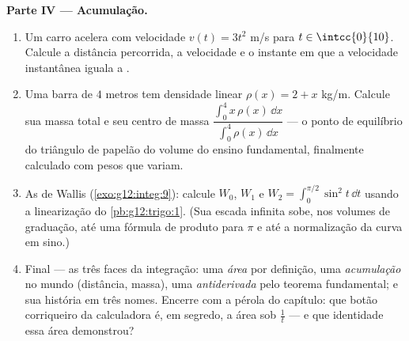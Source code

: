 \begin{problem}
\medskip
\noindent\textbf{Parte IV --- Acumulação.}
\begin{enumerate}[resume]
  \item Um carro acelera com velocidade $v(t) = 3t^2$ m/s para
        $t \in \intcc{0}{10}$. Calcule a distância percorrida, a
        velocidade  e o instante em que a velocidade
        instantânea iguala a .
  \item Uma barra de $4$ metros tem densidade linear
        $\rho(x) = 2 + x$ kg/m. Calcule sua massa total e seu
        centro de massa
        $\dfrac{\int_0^4 x\,\rho(x)\,\dd x}{\int_0^4
        \rho(x)\,\dd x}$ --- o ponto de equilíbrio do triângulo
        de papelão do volume do ensino fundamental, finalmente
        calculado com pesos que variam.
  \item As  de Wallis (\cref{exo:g12:integ:9}): calcule
        $W_0$, $W_1$ e $W_2 = \int_0^{\pi/2} \sin^2 t\,\dd t$
        usando a linearização do \cref{pb:g12:trigo:1}. (Sua
        escada infinita sobe, nos volumes de graduação, até uma
        fórmula de produto para $\pi$ e até a normalização da
        curva em sino.)
  \item Final --- as três faces da integração: uma \emph{área}
        por definição, uma \emph{acumulação} no mundo (distância,
        massa), uma \emph{antiderivada} pelo teorema fundamental;
        e sua história em três nomes. Encerre com a pérola do
        capítulo: que botão corriqueiro da calculadora é, em
        segredo, a área sob $\frac1t$ --- e que identidade essa
        área demonstrou?
\end{enumerate}
\end{problem}
